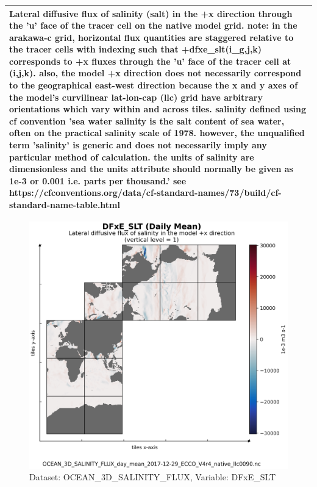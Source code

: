 \begin{longtable}{|m{}|m{}|m{}|m{}|}
\multicolumn{4}{|p{1\textwidth}|}{\footnotesize{{Lateral diffusive flux of salinity (salt) in the +x direction through the 'u' face of the tracer cell on the native model grid. note: in the arakawa-c grid, horizontal flux quantities are staggered relative to the tracer cells with indexing such that +dfxe\_slt(i\_g,j,k) corresponds to +x fluxes through the 'u' face of the tracer cell at (i,j,k). also, the model +x direction does not necessarily correspond to the geographical east-west direction because the x and y axes of the model's curvilinear lat-lon-cap (llc) grid have arbitrary orientations which vary within and across tiles. salinity defined using cf convention 'sea water salinity is the salt content of sea water, often on the practical salinity scale of 1978. however, the unqualified term 'salinity' is generic and does not necessarily imply any particular method of calculation. the units of salinity are dimensionless and the units attribute should normally be given as 1e-3 or 0.001 i.e. parts per thousand.' see https://cfconventions.org/data/cf-standard-names/73/build/cf-standard-name-table.html}}} \\ \hline
\end{longtable}

\begin{figure}[H]
\centering
\includegraphics[scale=0.55]{../images/plots/v4r4/native_plots/Ocean_Three-Dimensional_Salinity_Fluxes/DFxE_SLT.png}
\caption{Dataset: OCEAN\_3D\_SALINITY\_FLUX, Variable: DFxE\_SLT}
\label{tab:table-OCEAN_3D_SALINITY_FLUX_DFxE_SLT-Plot}
\end{figure}
\newpage
\pagebreak
